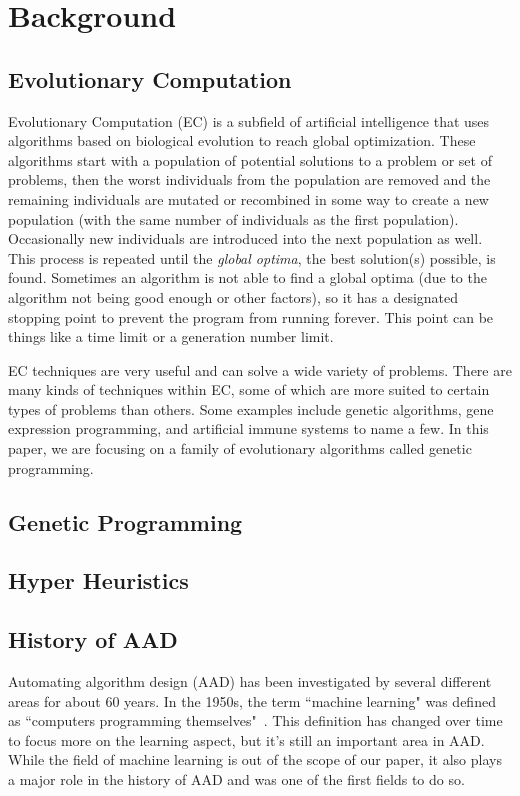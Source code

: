 \documentclass{sig-alternate}
\begin{document}
\section{Background}
\label{sec:background}

\subsection{Evolutionary Computation}
\label{sec:evocomp}
Evolutionary Computation (EC) is a subfield of artificial intelligence that uses algorithms based on biological evolution to reach global optimization. These algorithms start with a population of potential solutions to a problem or set of problems, then the worst individuals from the population are removed and the remaining individuals are mutated or recombined in some way to create a new population (with the same number of individuals as the first population). Occasionally new individuals are introduced into the next population as well. This process is repeated until the \textit{global optima}, the best solution(s) possible, is found. Sometimes an algorithm is not able to find a global optima (due to the algorithm not being good enough or other factors), so it has a designated stopping point to prevent the program from running forever. This point can be things like a time limit or a generation number limit.

EC techniques are very useful and can solve a wide variety of problems. There are many kinds of techniques within EC, some of which are more suited to certain types of problems than others. Some examples include genetic algorithms, gene expression programming, and artificial immune systems to name a few. In this paper, we are focusing on a family of evolutionary algorithms called genetic programming.

\subsection{Genetic Programming}
\label{sec:GP}

\subsection{Hyper Heuristics}
\label{sec:HH}


\subsection{History of AAD}
\label{sec:history}
Automating algorithm design (AAD) has been investigated by several different areas for about 60 years. In the 1950s, the term ``machine learning" was defined as ``computers programming themselves"~\cite{pappa:2014}. This definition has changed over time to focus more on the learning aspect, but it's still an important area in AAD. While the field of machine learning is out of the scope of our paper, it also plays a major role in the history of AAD and was one of the first fields to do so.
\end{document}
